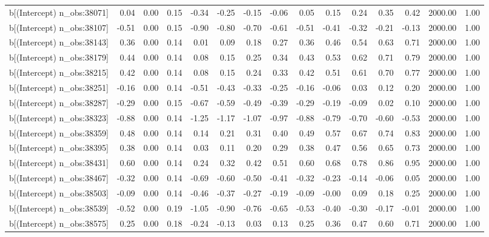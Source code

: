 \begin{table}[ht]
\begin{tabular}{rrrrrrrrrrrrrrr}
  b[(Intercept) n\_obs:38071] & 0.04 & 0.00 & 0.15 & -0.34 & -0.25 & -0.15 & -0.06 & 0.05 & 0.15 & 0.24 & 0.35 & 0.42 & 2000.00 & 1.00 \\ 
  b[(Intercept) n\_obs:38107] & -0.51 & 0.00 & 0.15 & -0.90 & -0.80 & -0.70 & -0.61 & -0.51 & -0.41 & -0.32 & -0.21 & -0.13 & 2000.00 & 1.00 \\ 
  b[(Intercept) n\_obs:38143] & 0.36 & 0.00 & 0.14 & 0.01 & 0.09 & 0.18 & 0.27 & 0.36 & 0.46 & 0.54 & 0.63 & 0.71 & 2000.00 & 1.00 \\ 
  b[(Intercept) n\_obs:38179] & 0.44 & 0.00 & 0.14 & 0.08 & 0.15 & 0.25 & 0.34 & 0.43 & 0.53 & 0.62 & 0.71 & 0.79 & 2000.00 & 1.00 \\ 
  b[(Intercept) n\_obs:38215] & 0.42 & 0.00 & 0.14 & 0.08 & 0.15 & 0.24 & 0.33 & 0.42 & 0.51 & 0.61 & 0.70 & 0.77 & 2000.00 & 1.00 \\ 
  b[(Intercept) n\_obs:38251] & -0.16 & 0.00 & 0.14 & -0.51 & -0.43 & -0.33 & -0.25 & -0.16 & -0.06 & 0.03 & 0.12 & 0.20 & 2000.00 & 1.00 \\ 
  b[(Intercept) n\_obs:38287] & -0.29 & 0.00 & 0.15 & -0.67 & -0.59 & -0.49 & -0.39 & -0.29 & -0.19 & -0.09 & 0.02 & 0.10 & 2000.00 & 1.00 \\ 
  b[(Intercept) n\_obs:38323] & -0.88 & 0.00 & 0.14 & -1.25 & -1.17 & -1.07 & -0.97 & -0.88 & -0.79 & -0.70 & -0.60 & -0.53 & 2000.00 & 1.00 \\ 
  b[(Intercept) n\_obs:38359] & 0.48 & 0.00 & 0.14 & 0.14 & 0.21 & 0.31 & 0.40 & 0.49 & 0.57 & 0.67 & 0.74 & 0.83 & 2000.00 & 1.00 \\ 
  b[(Intercept) n\_obs:38395] & 0.38 & 0.00 & 0.14 & 0.03 & 0.11 & 0.20 & 0.29 & 0.38 & 0.47 & 0.56 & 0.65 & 0.73 & 2000.00 & 1.00 \\ 
  b[(Intercept) n\_obs:38431] & 0.60 & 0.00 & 0.14 & 0.24 & 0.32 & 0.42 & 0.51 & 0.60 & 0.68 & 0.78 & 0.86 & 0.95 & 2000.00 & 1.00 \\ 
  b[(Intercept) n\_obs:38467] & -0.32 & 0.00 & 0.14 & -0.69 & -0.60 & -0.50 & -0.41 & -0.32 & -0.23 & -0.14 & -0.06 & 0.05 & 2000.00 & 1.00 \\ 
  b[(Intercept) n\_obs:38503] & -0.09 & 0.00 & 0.14 & -0.46 & -0.37 & -0.27 & -0.19 & -0.09 & -0.00 & 0.09 & 0.18 & 0.25 & 2000.00 & 1.00 \\ 
  b[(Intercept) n\_obs:38539] & -0.52 & 0.00 & 0.19 & -1.05 & -0.90 & -0.76 & -0.65 & -0.53 & -0.40 & -0.30 & -0.17 & -0.01 & 2000.00 & 1.00 \\ 
  b[(Intercept) n\_obs:38575] & 0.25 & 0.00 & 0.18 & -0.24 & -0.13 & 0.03 & 0.13 & 0.25 & 0.36 & 0.47 & 0.60 & 0.71 & 2000.00 & 1.00 \\ 

\end{tabular}
\end{table}
